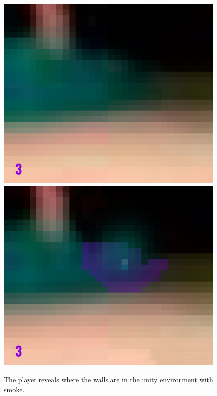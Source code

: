 \begin{figure}[p]
  \centering
  \includegraphics[width=\imgWidth]{images/game_systems/NoSmoke.png} \\[\picVdist]
  \includegraphics[width=\imgWidth]{images/game_systems/ThrowSmoke.png}
  \caption{The player reveals where the walls are in the unity environment with smoke.}
  \label{SmokeInEnvironment}
\end{figure}

